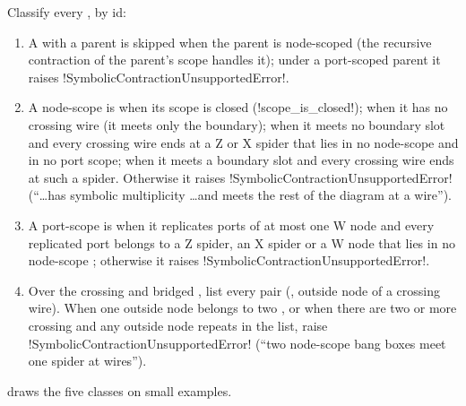 \begin{algorithm}\label{alg:semantics-plan}
Classify every \bbox{}, by id:
\begin{enumerate}
\item A \bbox{} with a parent is skipped when the parent is node-scoped (the recursive contraction of the parent's scope handles it); under a port-scoped parent it raises \py!SymbolicContractionUnsupportedError!.
\item A node-scope \bbox{} is  when its scope is closed (\py!scope_is_closed!);  when it has no crossing wire (it meets only the boundary);  when it meets no boundary slot and every crossing wire ends at a Z or X spider that lies in no node-scope \bbox{} and in no port scope;  when it meets a boundary slot and every crossing wire ends at such a spider. Otherwise it raises \py!SymbolicContractionUnsupportedError! (``\ldots has symbolic multiplicity \ldots and meets the rest of the diagram at a wire'').
\item A port-scope \bbox{} is  when it replicates ports of at most one W node and every replicated port belongs to a Z spider, an X spider or a W node that lies in no node-scope \bbox{}; otherwise it raises \py!SymbolicContractionUnsupportedError!.
\item Over the crossing and bridged \bboxes{}, list every pair (\bbox{}, outside node of a crossing wire). When one outside node belongs to two \bboxes{}, or when there are two or more crossing \bboxes{} and any outside node repeats in the list, raise \py!SymbolicContractionUnsupportedError! (``two node-scope bang boxes meet one spider at wires'').
\end{enumerate}
\end{algorithm}

 draws the five classes on small examples.

